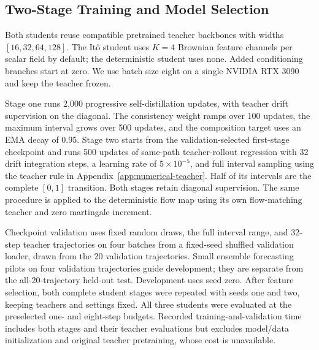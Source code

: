 \subsection{Two-Stage Training and Model Selection}
Both students reuse compatible pretrained teacher backbones with widths $[16,32,64,128]$. The It\^o student uses $K=4$ Brownian feature channels per scalar field by default; the deterministic student uses none. Added conditioning branches start at zero. We use batch size eight on a single NVIDIA RTX 3090 and keep the teacher frozen.

Stage one runs 2,000 progressive self-distillation updates, with teacher drift supervision on the diagonal. The consistency weight ramps over 100 updates, the maximum interval grows over 500 updates, and the composition target uses an EMA decay of 0.95. Stage two starts from the validation-selected first-stage checkpoint and runs 500 updates of same-path teacher-rollout regression with 32 drift integration steps, a learning rate of $5\times10^{-5}$, and full interval sampling using the teacher rule in Appendix~\ref{app:numerical-teacher}. Half of its intervals are the complete $[0,1]$ transition. Both stages retain diagonal supervision. The same procedure is applied to the deterministic flow map using its own flow-matching teacher and zero martingale increment.

Checkpoint validation uses fixed random draws, the full interval range, and 32-step teacher trajectories on four batches from a fixed-seed shuffled validation loader, drawn from the 20 validation trajectories. Small ensemble forecasting pilots on four validation trajectories guide development; they are separate from the all-20-trajectory held-out test. Development uses seed zero. After feature selection, both complete student stages were repeated with seeds one and two, keeping teachers and settings fixed. All three students were evaluated at the preselected one- and eight-step budgets. Recorded training-and-validation time includes both stages and their teacher evaluations but excludes model/data initialization and original teacher pretraining, whose cost is unavailable.

